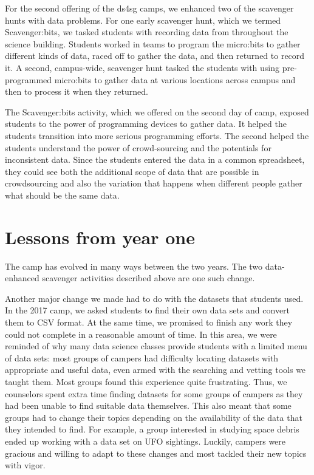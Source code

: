 For the second offering of the ds4sg camps, we enhanced two of the
scavenger hunts with data problems.  For one early scavenger hunt,
which we termed Scavenger:bits, we tasked students with recording
data from throughout the science building.  Students worked in teams
to program the micro:bits to gather different kinds of data, raced
off to gather the data, and then returned to record it.  A second,
campus-wide, scavenger hunt tasked the students with using
pre-programmed micro:bits to gather data at various locations across
campus and then to process it when they returned.

The Scavenger:bits activity, which we offered on the second
day of camp, exposed students to the power of programming devices
to gather data.  It helped the students transition into more serious
programming efforts.  The second helped the students understand the
power of crowd-sourcing and the potentials for inconsistent data.
Since the students entered the data in a common spreadsheet, they could
see both the additional scope of data that are possible in crowdsourcing
and also the variation that happens when different people gather
what should be the same data.

\section{Lessons from year one}

The camp has evolved in many ways between the two years.  The two
data-enhanced scavenger activities described above are one such
change.

Another major change we made had to do with the datasets that
students used.  In the 2017 camp, we asked students to find their
own data sets and convert them to CSV format.  At the same time,
we promised to finish any work they could not complete in a reasonable
amount of time.  In this area, we were reminded of why many data
science classes provide students with a limited menu of data sets:
most groups of campers had difficulty locating datasets with
appropriate and useful data, even armed with the searching and
vetting tools we taught them.  Most groups found this experience
quite frustrating.  Thus, we counselors spent extra time finding
datasets for some groups of campers as they had been unable to find
suitable data themselves.  This also meant that some groups had to
change their topics depending on the availability of the data that
they intended to find.  For example, a group interested in studying
space debris ended up working with a data set on UFO sightings.
Luckily, campers were gracious and willing to adapt to these changes
and most tackled their new topics with vigor.

